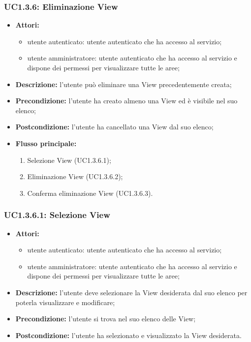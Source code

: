 \subsubsection{UC1.3.6: Eliminazione View}

\begin{itemize}
    \item \textbf{Attori:}
    \begin{itemize}
    	\item utente autenticato: utente autenticato che ha accesso al servizio;
    	\item utente amministratore: utente autenticato che ha accesso al servizio e dispone dei permessi per visualizzare tutte le aree;
	\end{itemize}
    \item \textbf{Descrizione:} l'utente può eliminare una View precedentemente creata;
    \item \textbf{Precondizione:} l'utente ha creato almeno una View ed è visibile nel suo elenco;
    \item \textbf{Postcondizione:} l'utente ha cancellato una View dal suo elenco;
    \item \textbf{Flusso principale:}

    \begin{enumerate}
        \item Selezione View (UC1.3.6.1);
        \item Eliminazione View (UC1.3.6.2);
        \item Conferma eliminazione View (UC1.3.6.3).
    \end{enumerate}

\end{itemize}

\subsubsection{UC1.3.6.1: Selezione View}

\begin{itemize}
 	\item \textbf{Attori:}
    \begin{itemize}
    	\item utente autenticato: utente autenticato che ha accesso al servizio;
    	\item utente amministratore: utente autenticato che ha accesso al servizio e dispone dei permessi per visualizzare tutte le aree;
	\end{itemize}
    \item \textbf{Descrizione:} l'utente deve selezionare la View desiderata dal suo elenco per poterla visualizzare e modificare;
    \item \textbf{Precondizione:} l'utente si trova nel suo elenco delle View;
    \item \textbf{Postcondizione:} l'utente ha selezionato e visualizzato la View desiderata.
\end{itemize}


